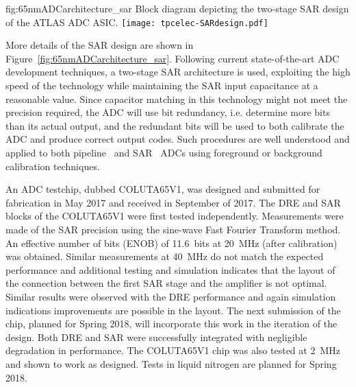 \begin{dunefigure}
{fig:65nmADCarchitecture_sar}
{Block diagram depicting the two-stage SAR design of the ATLAS ADC ASIC.}
\texttt{[image: tpcelec-SARdesign.pdf]}
\end{dunefigure}

More details of the SAR design are shown in Figure~\ref{fig:65nmADCarchitecture_sar}. 
Following current state-of-the-art ADC development techniques, a two-stage 
SAR architecture is used, exploiting the high speed of the technology while maintaining the SAR input 
capacitance at a reasonable value. Since capacitor matching in this technology might not meet the 
precision required, the ADC will use bit redundancy, i.e. determine more bits than its actual output, 
and the redundant bits will be used to both calibrate the ADC and produce correct output codes. 
Such procedures are well understood and applied to both pipeline~\cite{Kuppambatti:2013nfa} and 
SAR~\cite{5999734} ADCs using foreground or background calibration techniques.

An ADC testchip, dubbed COLUTA65V1, was designed and submitted for fabrication in May 2017 and received
in September of 2017.  The DRE and SAR blocks of the COLUTA65V1 were first tested independently. Measurements were made
of the SAR precision using the sine-wave Fast Fourier Transform method. An effective number of bits
(ENOB) of \SI{11.6}{bits} at \SI{20}{MHz} (after calibration) was obtained.
Similar measurements at \SI{40}{MHz} do not match the expected performance and 
additional testing and simulation indicates that the layout of the connection between the first SAR stage and the amplifier is not optimal. Similar results were observed with
the DRE performance and again simulation indications improvements are possible in the layout. 
The next submission of the chip, planned for Spring 2018, will incorporate this work in the iteration 
of the design. Both DRE and SAR were successfully integrated with negligible degradation in performance. The COLUTA65V1 chip was also tested at 2~MHz and shown to work as designed.  Tests in liquid nitrogen are planned for Spring 2018.

